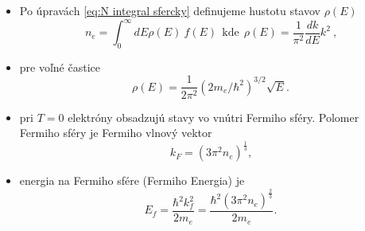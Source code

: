 \documentclass[
	11pt, %
]{beamer}
\begin{document}
\begin{frame}


\begin{itemize}
\item Po úpravách \eqref{eq:N integral sfercky} definujeme hustotu stavov $\rho(E)$
\begin{equation}
 \label{eq:N integral sfer energ}
 n_e =   \int_0^{\infty}dE\rho(E)\ f(E) \ \ \text{kde}\ \ \rho(E)=\frac{1}{\pi^2} \frac{dk}{dE} k^2  \ \text{,}
\end{equation}
\item pre voľné častice 
\begin{equation}
 \label{eq:rho_par}
 \rho(E)=\frac{1}{2\pi^2}{(2 m_e/\hbar^2)}^{3/2} \sqrt{E} \text{.}
\end{equation}
\item pri $T=0$ elektróny obsadzujú stavy vo vnútri Fermiho sféry. Polomer Fermiho sféry je Fermiho vlnový vektor
\begin{equation}
 \label{eq:kf}
 k_F=(3\pi^2 n_e)^{\frac{1}{3}}\text{,}
\end{equation}
\item energia na Fermiho sfére (Fermiho Energia) je
\begin{equation}
 \label{eq:ef}
 E_f=\frac{\hbar^2 k_f^2}{2m_e}=\frac{\hbar^2(3\pi^2 n_e)^{\frac{2}{3}}  }{2m_e} \text{.}
\end{equation}
\end{itemize}
\end{frame}
\end{document}
